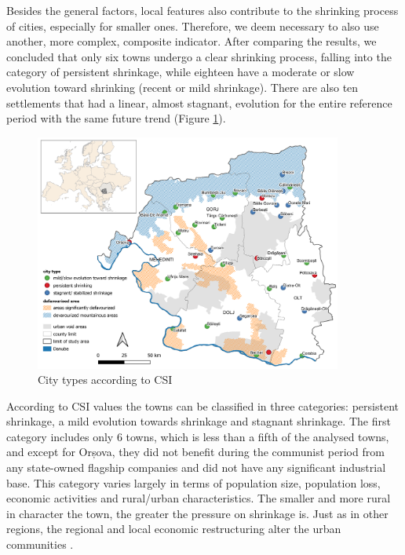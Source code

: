 Besides the general factors, local features also contribute to the shrinking process of cities, especially for smaller ones. Therefore, we deem necessary to also use another, more complex, composite indicator. After comparing the results, we concluded that only six towns undergo a clear shrinking process, falling into the category of persistent shrinkage, while eighteen have a moderate or slow evolution toward shrinking (recent or mild shrinkage). There are also ten settlements that had a linear, almost stagnant, evolution for the entire reference period with the same future trend (Figure \ref{figure:shrinking}).

\begin{figure}[htbp]
	\centering
	\includegraphics[width=0.9\textwidth]{shrinking}
	\caption{City types according to CSI}
	\label{figure:shrinking}
\end{figure}

According to CSI values the towns can be classified in three categories: persistent shrinkage, a mild evolution towards shrinkage and stagnant shrinkage. The first category includes only 6 towns, which is less than a fifth of the analysed towns, and except for Orșova, they did not benefit during the communist period from any state-owned flagship companies and did not have any significant industrial base. This category varies largely in terms of population size, population loss, economic activities and rural/urban characteristics. The smaller and more rural in character the town, the greater the pressure on shrinkage is. Just as in other regions, the regional and local economic restructuring alter the urban communities \citep{jucu_economic_2016}.

